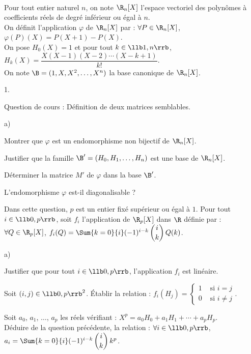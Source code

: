 \documentclass[11pt]{article}
\begin{document}
\begin{exerciceAP}~\\
Pour tout entier naturel $n$, on note $\R_n[X]$ l'espace vectoriel des 
polynômes à coefficients réels de degré inférieur ou égal à $n$.\\
On définit l'application $\varphi$ de $\R_n[X]$ par : $\forall 
P\in\R_n[X]$, $\varphi(P)(X)=P(X+1)-P(X)$.\\[.1cm]
On pose $H_0(X)=1$ et pour tout $k\in\llb 1,n\rrb$, 
$H_k(X)=\dfrac{X(X-1)(X-2)\cdots(X-k+1)}{k!}.$\\
On note $\B=(1,X,X^2,\hdots,X^n)$ la base canonique de $\R_n[X]$.
\begin{noliste}{1.}
    \setlength{\itemsep}{2mm}
  \item Question de cours : Définition de deux matrices semblables.
  
  \item 
  \begin{noliste}{a)}
    \setlength{\itemsep}{2mm}
    \item Montrer que $\varphi$ est un endomorphisme non bijectif de 
    $\R_n[X]$.
    
    \item Justifier que la famille $\B'=(H_0,H_1,\hdots,H_n)$ est 
    une base de $\R_n[X]$.
    
    \item Déterminer la matrice $M'$ de $\varphi$ dans la base 
    $\B'$.
    
    \item L'endomorphisme $\varphi$ est-il diagonalisable ?
  \end{noliste}
  
  \item Dans cette question, $p$ est un entier fixé supérieur ou égal à 
  $1$. Pour tout $i\in\llb 0,p\rrb$, soit $f_i$ l'application de 
  $\R_p[X]$ dans $\R$ définie par : $\forall Q\in\R_p[X]$, 
  $f_i(Q)=\Sum{k=0}{i} (-1)^{i-k} \, \dbinom{i}{k} \, Q(k)$.
  \begin{noliste}{a)}
    \setlength{\itemsep}{2mm}
    \item Justifier que pour tout $i\in\llb 0,p\rrb$, l'application 
    $f_i$ est linéaire.
    
    \item Soit $(i,j)\in\llb 0,p\rrb^2$. Établir la relation : 
    $f_i(H_j)=\left\{
    \begin{array}{ll}
      1 & \mbox{ si $i=j$}\\
      0 & \mbox{ si $i\neq j$}
    \end{array}
    \right.$.
    
    \item Soit $a_0$, $a_1$, $\hdots$, $a_p$ les réels vérifiant : 
    $X^p = a_0H_0+a_1H_1+\cdots +a_pH_p$.\\
    Déduire de la question précédente, la relation : $\forall i 
    \in\llb 0,p\rrb$, $a_i=\Sum{k=0}{i} (-1)^{i-k} \, \dbinom{i}{k} 
    \, k^p$.
  \end{noliste}
\end{noliste}
\end{exerciceAP}
\end{document}
